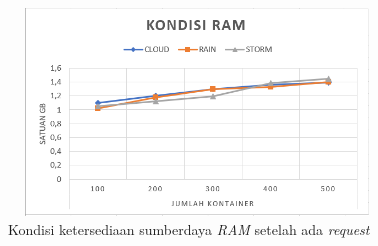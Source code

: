 				\begin{figure}[H]
					\centering
					\includegraphics[width=10cm,height=5.5cm]{Images/C-5/performaram.PNG}
					\caption{Kondisi ketersediaan sumberdaya \textit{RAM} setelah ada \textit{request}}
					\label{performaram}
				\end{figure}
			
				
			